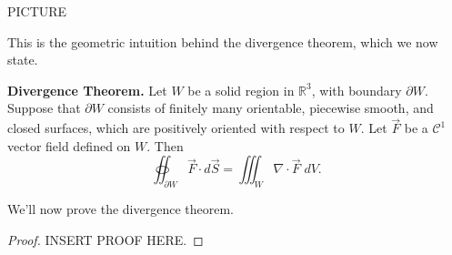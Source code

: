 \documentclass{ximera}
\begin{document}
PICTURE

This is the geometric intuition behind the divergence theorem, which we now state.

\begin{theorem}
\textbf{Divergence Theorem.} Let $W$ be a solid region in $\mathbb{R}^3$, with boundary $\partial W$. Suppose that $\partial W$ consists of finitely many orientable, piecewise smooth, and closed surfaces, which are positively oriented with respect to $W$. Let $\vec{F}$ be a $\mathcal{C}^1$ vector field defined on $W$. Then
\[
\oiint_{\partial W} \vec{F}\cdot d\vec{S} = \iiint_W \nabla\cdot \vec{F}\;dV.
\]
\end{theorem}

We'll now prove the divergence theorem.

\begin{proof}
INSERT PROOF HERE.
\end{proof}
\end{document}
